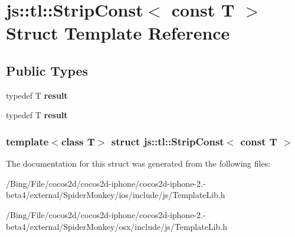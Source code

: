 \hypertarget{structjs_1_1tl_1_1_strip_const_3_01const_01_t_01_4}{\section{js\-:\-:tl\-:\-:Strip\-Const$<$ const T $>$ Struct Template Reference}
\label{structjs_1_1tl_1_1_strip_const_3_01const_01_t_01_4}
}
\subsection*{Public Types}
\begin{DoxyCompactItemize}
\item 
\hypertarget{structjs_1_1tl_1_1_strip_const_3_01const_01_t_01_4_a5da8ca64a2c4d4cb7ad17fea52a469a6}{typedef T {\bfseries result}}\label{structjs_1_1tl_1_1_strip_const_3_01const_01_t_01_4_a5da8ca64a2c4d4cb7ad17fea52a469a6}

\item 
\hypertarget{structjs_1_1tl_1_1_strip_const_3_01const_01_t_01_4_a5da8ca64a2c4d4cb7ad17fea52a469a6}{typedef T {\bfseries result}}\label{structjs_1_1tl_1_1_strip_const_3_01const_01_t_01_4_a5da8ca64a2c4d4cb7ad17fea52a469a6}

\end{DoxyCompactItemize}
\subsubsection*{template$<$class T$>$ struct js\-::tl\-::\-Strip\-Const$<$ const T $>$}



The documentation for this struct was generated from the following files\-:\begin{DoxyCompactItemize}
\item 
/\-Bing/\-File/cocos2d/cocos2d-\/iphone/cocos2d-\/iphone-\/2.-\/beta4/external/\-Spider\-Monkey/ios/include/js/Template\-Lib.\-h\item 
/\-Bing/\-File/cocos2d/cocos2d-\/iphone/cocos2d-\/iphone-\/2.-\/beta4/external/\-Spider\-Monkey/osx/include/js/Template\-Lib.\-h\end{DoxyCompactItemize}
